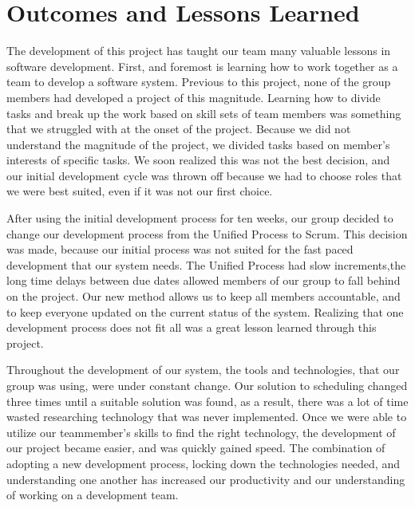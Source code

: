 \documentclass[12pt]{article}
\begin{document}
\section{Outcomes and Lessons Learned} %
The development of this project has taught our team many valuable lessons in software development. First, and foremost is learning how to work together as a team to develop a software system. Previous to this project, none of the group members had developed a project of this magnitude. Learning how to divide tasks and break up the work based on skill sets of team members was something that we struggled with at the onset of the project. Because we did not understand the magnitude of the project, we divided tasks based on member's interests of specific tasks. We soon realized this was not the best decision, and our initial development cycle was thrown off because we had to choose roles that we were best suited, even if it was not our first choice.

After using the initial development process for ten weeks, our group decided to change our development process from the Unified Process to Scrum. This decision was made, because our initial process was not suited for the fast paced development that our system needs. The Unified Process had slow increments,the long time delays between due dates allowed members of our group to fall behind on the project. Our new method allows us to keep all members accountable, and to keep everyone updated on the current status of the system. Realizing that one development process does not fit all was a great lesson learned through this project.

Throughout the development of our system, the tools and technologies, that our group was using, were under constant change. Our solution to scheduling changed three times until a suitable solution was found, as a result, there was a lot of time wasted researching technology that was never implemented. Once we were able to utilize our teammember's skills to find the right technology, the development of our project became easier, and was quickly gained speed. The combination of adopting a new development process, locking down the technologies needed, and understanding one another has increased our productivity and our understanding of working on a development team. 
\end{document}
